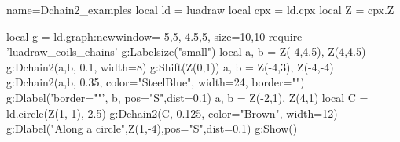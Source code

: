\begin{luadraw}{name=Dchain2_examples}
local ld = luadraw
local cpx = ld.cpx
local Z = cpx.Z

local g = ld.graph:new{window={-5,5,-4.5,5}, size={10,10}}
require 'luadraw_coils_chains'
g:Labelsize("small")
local a, b = Z(-4,4.5), Z(4,4.5)
g:Dchain2({a,b}, 0.1, {width=8})
g:Shift(Z(0,1))
a, b = Z(-4,3), Z(-4,-4)
g:Dchain2({a,b}, 0.35, {color="SteelBlue", width=24, border=""})
g:Dlabel('border=""', b, {pos="S",dist=0.1})
a, b = Z(-2,1), Z(4,1)
local C = ld.circle(Z(1,-1), 2.5)
g:Dchain2(C, 0.125, {color="Brown", width=12})
g:Dlabel("Along a circle",Z(1,-4),{pos="S",dist=0.1})
g:Show()
\end{luadraw}
